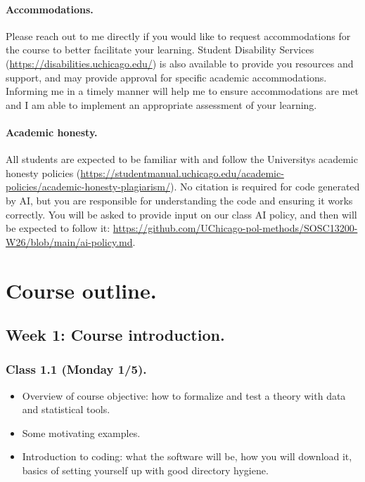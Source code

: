 \documentclass[letterpaper, 12pt, parskip=full,DIV=10]{scrartcl}
\begin{document}
\paragraph{Accommodations.}
Please reach out to me directly if you would like to request accommodations for the course to better facilitate your learning.
Student Disability Services (\url{https://disabilities.uchicago.edu/}) is also available to provide you resources and support, and may provide approval for specific academic accommodations.
Informing me in a timely manner will help me to ensure accommodations are met and I am able to implement an appropriate assessment of your learning.

\paragraph{Academic honesty.}
All students are expected to be familiar with and follow the University\textquotesingle s academic honesty policies (\url{https://studentmanual.uchicago.edu/academic-policies/academic-honesty-plagiarism/}). 
No citation is required for code generated by AI, but you are responsible for understanding the code and ensuring it works correctly. 
You will be asked to provide input on our class AI policy, and then will be expected to follow it: \url{https://github.com/UChicago-pol-methods/SOSC13200-W26/blob/main/ai-policy.md}. 

\section*{Course outline.}

\subsection*{Week 1: Course introduction.}
\subsubsection*{Class 1.1 (Monday 1/5).}
\begin{itemize}
\item Overview of course objective: how to formalize and test a theory with data and statistical tools.
\item Some motivating examples.
\item Introduction to coding: what the software will be, how you will download it, basics of setting yourself up with good directory hygiene.
\end{itemize}
\end{document}

